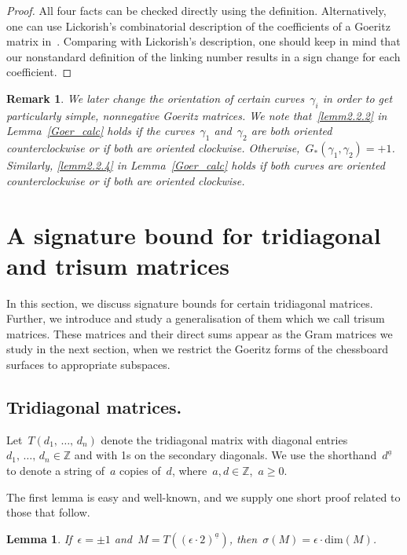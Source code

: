 \documentclass[10pt,a4paper]{amsart}
\numberwithin{equation}{section}
\newcommand{\rdim}{\mathrm{dim}}
\newcommand{\bbZ}{\mathbb{Z}}
\newtheorem{lemm}[theo]{Lemma}
\newtheorem{rema}[theo]{Remark}
\begin{document}
\begin{proof}
All four facts can be checked directly using the definition. Alternatively, one can use Lickorish's combinatorial description of the coefficients of a Goeritz matrix in~\cite[Chapter~9]{Lickorish}. Comparing with Lickorish's description, one should keep in mind that our nonstandard definition of the linking number results in a sign change for each coefficient.
\end{proof}

\begin{rema}\label{Goeritz_offdiag_remark}
We later change the orientation of certain curves~$\gamma_i$ in order to get particularly simple, nonnegative Goeritz matrices. We note that~\eqref{lemm2.2.2} in Lemma~\ref{Goer_calc} holds if the curves~$\gamma_1$ and~$\gamma_2$ are both oriented counterclockwise or if both are oriented clockwise. Otherwise,~$G_\ast(\gamma_1, \gamma_2) = +1$. Similarly, \eqref{lemm2.2.4} in Lemma~\ref{Goer_calc} holds if both curves are oriented counterclockwise or if both are oriented clockwise.
\end{rema}



\section{A signature bound for tridiagonal and trisum matrices}\label{s: tridiagonal}

In this section, we discuss signature bounds for certain tridiagonal matrices. Further, we introduce and study a generalisation of them which we call trisum matrices. These matrices and their direct sums appear as the Gram matrices we study in the next section, when we restrict the Goeritz forms of the chessboard surfaces to appropriate subspaces.


\subsection{Tridiagonal matrices.} 

Let~$T(d_1,\,\dots,\,d_n)$ denote the tridiagonal matrix with diagonal entries~$d_1,\,\dots,\,d_n \in \bbZ$ and with 1s on the secondary diagonals. We use the shorthand~$d^{\underline a}$ to denote a string of~$a$ copies of~$d$, where~$a,d \in \bbZ$,~$a \ge 0$.

The first lemma is easy and well-known, and we supply one short proof related to those that follow.

\begin{lemm}\label{pathsignature_lemma}
If~$\epsilon = \pm1$ and~$M = T((\epsilon \cdot 2)^{\underline a})$, then~$\sigma(M)= \epsilon \cdot \rdim (M)$.
\end{lemm}
\end{document}
